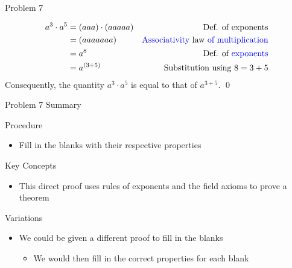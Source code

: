 \begin{problem}{Problem 7}
\begin{highlight}[Solution]
        \begin{align*}
            a^{3} \cdot a^{5} & = (aaa) \cdot (aaaaa) & \text{Def. of exponents} \\
            & = (aaaaaaa) & \text{\textcolor{blue}{Associativity} law \textcolor{blue}{of multiplication}} \\
            & = a^{8} & \text{Def. of \textcolor{blue}{exponents}} \\
            & = a^{(3 + 5)} & \text{Substitution using } 8 = 3 + 5
        \end{align*}
        Consequently, the quantity $a^{3}\cdot a^{5}$ is equal to that of $a^{3 + 5}$. \qed
    \end{highlight}
\end{problem}

\begin{summary}{Problem 7 Summary}
    \begin{statement}{Procedure}
        \begin{itemize}
            \item Fill in the blanks with their respective properties
        \end{itemize}
    \end{statement}
    \begin{statement}{Key Concepts}
        \begin{itemize}
            \item This direct proof uses rules of exponents and the field axioms to prove a theorem
        \end{itemize}
    \end{statement}
    \begin{statement}{Variations}
        \begin{itemize}
            \item We could be given a different proof to fill in the blanks
            \begin{itemize}
                \item We would then fill in the correct properties for each blank
            \end{itemize}
        \end{itemize}
    \end{statement}
\end{summary}

